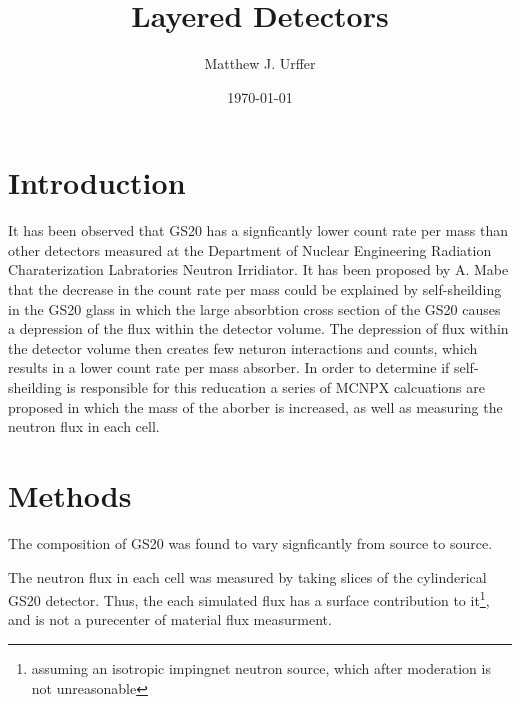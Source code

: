 \documentclass[draftcls,onecolumn]{IEEEtran}
\begin{document}
\title{Layered Detectors}
\author{Matthew J. Urffer}
\date{\today}
\maketitle


\listoftodos
\tableofcontents
\listoffigures
\listoftables
\lstlistoflistings

\section{Introduction}
It has been observed that GS20 has a signficantly lower count rate per mass  than other detectors measured at the Department of Nuclear Engineering Radiation Charaterization Labratories Neutron Irridiator.
It has been proposed by A. Mabe that the decrease in the count rate per mass  could be explained by self-sheilding in the GS20 glass in which the large absorbtion cross section of the GS20 causes a depression of the flux within the detector volume.
The depression of flux within the detector volume then creates few neturon interactions and counts, which results in a lower count rate per mass absorber.
In order to determine if self-sheilding is responsible for this reducation a series of MCNPX calcuations are proposed in which the mass of the aborber is increased, as well as measuring the neutron flux in each cell.


\section{Methods}

The composition of GS20 was found to vary signficantly from source to source.

The neutron flux in each cell was measured by taking slices of the cylinderical GS20 detector.
Thus, the each simulated flux has a surface contribution to it\footnote{assuming an isotropic impingnet neutron source, which after moderation is not unreasonable}, and is not a purecenter of material flux measurment.
\end{document}
